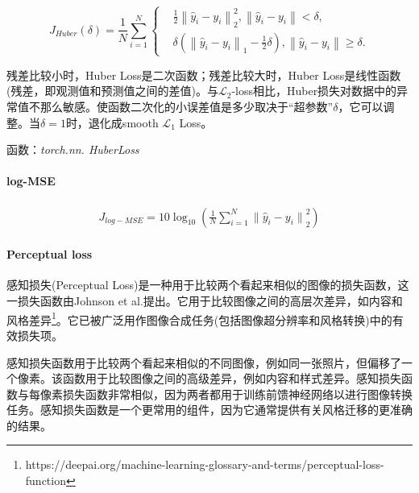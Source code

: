 \documentclass[letterpaper,12pt]{article}
\begin{document}
			\begin{equation}
			J_{Huber}(\delta)= \frac{1}{N}\sum_{i=1}^{N}
				\left\{
				\begin{aligned}
					&\frac{1}{2}{\left\|\hat{y}_i - y_i \right\|}_2^{2}, \left\| \hat{y}_i -y_i \right\| < \delta , \\
					&\delta\left({\left\|\hat{y}_i - y_i \right\|}_1 - \frac{1}{2}\delta \right), \left\| \hat{y}_i -y_i \right\| \geq \delta.
				\end{aligned}
				\right.
			\end{equation}
	
			残差比较小时，Huber Loss是二次函数；残差比较大时，Huber Loss是线性函数(残差，即观测值和预测值之间的差值)。与$\mathcal{L}_2$-loss相比，Huber损失对数据中的异常值不那么敏感。使函数二次化的小误差值是多少取决于“超参数”$\delta$，它可以调整。当$\delta=1$时，退化成smooth $\mathcal{L}_1$ Loss。
	
			函数：\textit{torch.nn. HuberLoss}
			
			\paragraph{log-MSE}
			
			\begin{equation}
				\begin{aligned}
					J_{log-MSE} = 10\log_{10}\left(\frac{1}{N} \sum_{i=1}^{N} {\| \hat{y}_i - y_i \|}_{2}^2 \right)
				\end{aligned}
			\end{equation}
	
			\paragraph{Perceptual loss}
			
			感知损失(Perceptual Loss)是一种用于比较两个看起来相似的图像的损失函数，这一损失函数由Johnson et al.\cite{johnson2016perceptual}提出。它用于比较图像之间的高层次差异，如内容和风格差异\footnote{https://deepai.org/machine-learning-glossary-and-terms/perceptual-loss-function}。它已被广泛用作图像合成任务(包括图像超分辨率和风格转换)中的有效损失项。
			
			感知损失函数用于比较两个看起来相似的不同图像，例如同一张照片，但偏移了一个像素。该函数用于比较图像之间的高级差异，例如内容和样式差异。感知损失函数与每像素损失函数非常相似，因为两者都用于训练前馈神经网络以进行图像转换任务。感知损失函数是一个更常用的组件，因为它通常提供有关风格迁移的更准确的结果。
			
\end{document}
